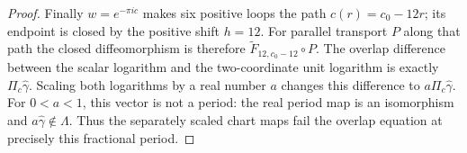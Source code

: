 \begin{proof}
Finally \(w=e^{-\pi i c}\) makes six positive loops the path
\(c(r)=c_0-12r\); its endpoint is closed by the positive shift
\(h=12\). For parallel transport $P$ along that path the closed diffeomorphism is therefore $\widetilde F_{12,c_0-12}\circ P$. The overlap difference between the scalar logarithm and the two-coordinate unit logarithm is exactly $\Pi_c\widehat\gamma$. Scaling both logarithms by a real number $a$ changes this difference to $a\Pi_c\widehat\gamma$. For $0<a<1$, this vector is not a period: the real period map is an isomorphism and $a\widehat\gamma\notin\Lambda$. Thus the separately scaled chart maps fail the overlap equation at precisely this fractional period.
\end{proof}